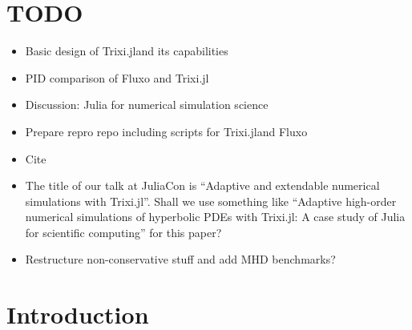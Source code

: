 \documentclass{juliacon}
\newcommand{\trixi}{Trixi.jl}
\begin{document}


\maketitle

\begin{abstract}
We present Trixi.jl, a Julia library for adaptive high-order numerical simulations
of hyperbolic partial differential equations (PDEs). Utilizing Julia's strengths,
Trixi.jl is extendable, easy to use, and fast. We describe the main design choices
that allow satisfying these goals and compare Trixi.jl with an established open
source Fortran code for hyperbolic PDEs using the same numerical methods.
We conclude with an assessment of Julia for simulation-focused scientific
computing, an area that is still dominated by traditional high-performance
computing languages such as C, C++, and Fortran.
\end{abstract}


\section*{TODO}

\begin{itemize}
  \item Basic design of \trixi and its capabilities
  \item PID comparison of Fluxo and \trixi
  \item Discussion: Julia for numerical simulation science
  \item Prepare repro repo including scripts for \trixi and Fluxo
  \item Cite \cite{bezanson2017julia,schlottkelakemper2021purely,rackauckas2017differentialequations,revels2016forward,ranocha2021sbp}
  \item The title of our talk at JuliaCon is
  ``Adaptive and extendable numerical simulations with Trixi.jl''.
  Shall we use something like
  ``Adaptive high-order numerical simulations of hyperbolic PDEs with Trixi.jl:
  A case study of Julia for scientific computing'' for this paper?
  \item Restructure non-conservative stuff and add MHD benchmarks?
\end{itemize}


\section{Introduction}
\end{document}
